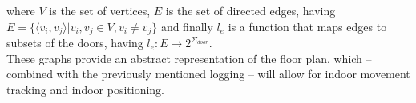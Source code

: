 where $V$ is the set of vertices, $E$ is the set of directed edges, having $E = \{\langle v_i, v_j \rangle | v_i, v_j \in V,  v_i \not= v_j\}$ and finally $l_e$ is a function that maps edges to subsets of the doors, having $l_e : E \rightarrow 2^{\Sigma_{door}}$. \\

These graphs provide an abstract representation of the floor plan, which -- combined with the previously mentioned logging -- will allow for indoor movement tracking and indoor positioning. 

